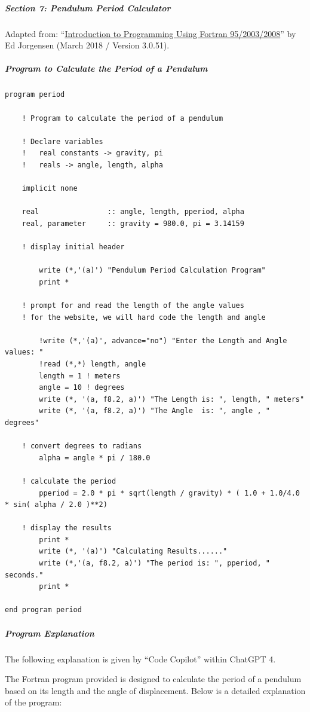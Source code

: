 \subparagraph{Section 7: Pendulum Period Calculator}

Adapted from: ``\href{https://open.umn.edu/opentextbooks/textbooks/introduction-to-programming-using-fortran-95-2003-2008}{Introduction to Programming Using Fortran 95/2003/2008}'' by Ed Jorgensen (March 2018 / Version 3.0.51).

\subparagraph{Program to Calculate the Period of a Pendulum}

\begin{verbatim}
program period

    ! Program to calculate the period of a pendulum

    ! Declare variables
    !   real constants -> gravity, pi
    !   reals -> angle, length, alpha

    implicit none

    real                :: angle, length, pperiod, alpha
    real, parameter     :: gravity = 980.0, pi = 3.14159

    ! display initial header
        
        write (*,'(a)') "Pendulum Period Calculation Program"
        print *

    ! prompt for and read the length of the angle values
    ! for the website, we will hard code the length and angle

        !write (*,'(a)', advance="no") "Enter the Length and Angle values: "
        !read (*,*) length, angle
        length = 1 ! meters
        angle = 10 ! degrees
	    write (*, '(a, f8.2, a)') "The Length is: ", length, " meters"
	    write (*, '(a, f8.2, a)') "The Angle  is: ", angle , " degrees"

    ! convert degrees to radians
        alpha = angle * pi / 180.0

    ! calculate the period
        pperiod = 2.0 * pi * sqrt(length / gravity) * ( 1.0 + 1.0/4.0 * sin( alpha / 2.0 )**2)

    ! display the results
        print *
        write (*, '(a)') "Calculating Results......"
        write (*,'(a, f8.2, a)') "The period is: ", pperiod, " seconds."
        print *

end program period
\end{verbatim}

\subparagraph{Program Explanation}

The following explanation is given by ``Code Copilot'' within ChatGPT 4.

The Fortran program provided is designed to calculate the period of a pendulum based on its length and the angle of displacement. Below is a detailed explanation of the program:

